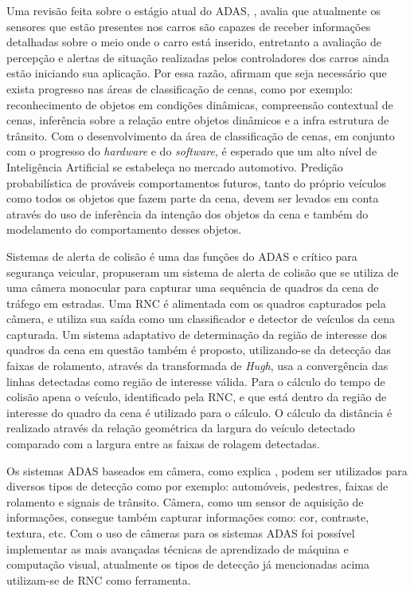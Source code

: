 \documentclass[
	12pt,				%
    oneside,			%
	a4paper,			%
	english,			%
	french,				%
	spanish,			%
	brazil,				%
	]{abntex2}
\begin{document}
Uma revisão feita sobre o estágio atual do ADAS, , avalia que atualmente os sensores que estão presentes nos carros são capazes de receber informações detalhadas sobre o meio onde o carro está inserido, entretanto a avaliação de percepção e alertas de situação realizadas pelos controladores dos carros ainda estão iniciando sua aplicação. Por essa razão, afirmam que seja necessário que exista progresso nas áreas de classificação de cenas, como por exemplo: reconhecimento de objetos em condições dinâmicas, compreensão contextual de cenas, inferência sobre a relação entre objetos dinâmicos e a infra estrutura de trânsito. Com o desenvolvimento da área de classificação de cenas, em conjunto com o progresso do \textit{hardware} e do \textit{software}, é esperado que um alto nível de Inteligência Artificial se estabeleça no mercado automotivo. Predição probabilística de prováveis comportamentos futuros, tanto do próprio veículos como todos os objetos que fazem parte da cena, devem ser levados em conta através do uso de inferência da intenção dos objetos da cena e também do modelamento do comportamento desses objetos.

Sistemas de alerta de colisão é uma das funções do ADAS e crítico para segurança veicular,  propuseram um sistema de alerta de colisão que se utiliza de uma câmera monocular para capturar uma sequência de quadros da cena de tráfego em estradas. Uma RNC é alimentada com os quadros capturados pela câmera, e utiliza sua saída como um classificador e detector de veículos da cena capturada. Um sistema adaptativo de determinação da região de interesse dos quadros da cena em questão também é proposto, utilizando-se da detecção das faixas de rolamento, através da transformada de \textit{Hugh}, usa a convergência das linhas detectadas como região de interesse válida. Para o cálculo do tempo de colisão apena o veículo, identificado pela RNC, e que está dentro da região de interesse do quadro da cena é utilizado para o cálculo. O cálculo da distância é realizado através da relação geométrica da largura do veículo detectado comparado com a largura entre as faixas de rolagem detectadas.

Os sistemas ADAS baseados em câmera, como explica , podem ser utilizados para diversos tipos de detecção como por exemplo: automóveis, pedestres, faixas de rolamento e signais de trânsito. Câmera, como um sensor de aquisição de informações, consegue também capturar informações como: cor, contraste, textura, etc. Com o uso de câmeras para os sistemas ADAS foi possível implementar as mais avançadas técnicas de aprendizado de máquina e computação visual, atualmente os tipos de detecção já mencionadas acima utilizam-se de RNC como ferramenta.
\end{document}

